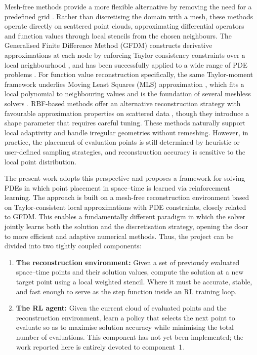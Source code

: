 \documentclass[12pt, a4paper, twoside]{report}
\theoremstyle{plain}
\theoremstyle{definition}
\begin{document}
Mesh-free methods provide a more flexible alternative by removing the need for a predefined grid \cite{griebel05}. Rather than discretising the domain with a mesh, these methods operate directly on scattered point clouds, approximating differential operators and function values through local stencils from the chosen neighbours. The Generalised Finite Difference Method (GFDM) constructs derivative approximations at each node by enforcing Taylor consistency constraints over a local neighbourhood \cite{benito2001, gavete2003}, and has been successfully applied to a wide range of PDE problems \cite{zheng22}. For function value reconstruction specifically, the same Taylor-moment framework underlies Moving Least Squares (MLS) approximation \cite{lancaster81}, which fits a local polynomial to neighbouring values and is the foundation of several meshless solvers \cite{gambaruto2026}. RBF-based methods offer an alternative reconstruction strategy with favourable approximation properties on scattered data \cite{fornberg2015}, though they introduce a shape parameter that requires careful tuning. These methods naturally support local adaptivity and handle irregular geometries without remeshing. However, in practice, the placement of evaluation points is still determined by heuristic or user-defined sampling strategies, and reconstruction accuracy is sensitive to the local point distribution.

The present work adopts this perspective and proposes a framework for solving PDEs in which point placement in space--time is learned via reinforcement learning. The approach is built on a mesh-free reconstruction environment based on Taylor-consistent local approximations with PDE constraints, closely related to GFDM. This enables a fundamentally different paradigm in which the solver jointly learns both the solution and the discretisation strategy, opening the door to more efficient and adaptive numerical methods.
Thus, the project can be divided into two tightly coupled components:

\begin{enumerate}
    \item \textbf{The reconstruction environment:}
    Given a set of previously evaluated space--time points and their solution values, compute the solution at a new target point using a local weighted stencil. Where it must be
    accurate, stable, and fast enough to serve as the step function inside an RL training loop.

    \item \textbf{The RL agent:} Given the current cloud of evaluated points and the
    reconstruction environment, learn a policy that selects the next point to evaluate so as to maximise solution accuracy while minimising the total number of evaluations.
    This component has not yet been implemented; the work
    reported here is entirely devoted to component~1.
\end{enumerate}
\end{document}
